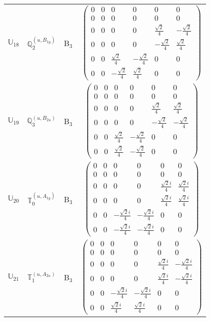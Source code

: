 \documentclass[fleqn,10pt,landscape]{article}
\begin{document}
\begin{itemize}
\begin{center}
\begin{longtable}{c|c|c|c}
$ \mathbb{U}_{18} $ & $\mathbb{Q}_{2}^{(u,B_{1g})}$ & B$_{3}$ & $\begin{pmatrix} 0 & 0 & 0 & 0 & 0 & 0 \\ 0 & 0 & 0 & 0 & 0 & 0 \\ 0 & 0 & 0 & 0 & \frac{\sqrt{2}}{4} & - \frac{\sqrt{2}}{4} \\ 0 & 0 & 0 & 0 & - \frac{\sqrt{2}}{4} & \frac{\sqrt{2}}{4} \\ 0 & 0 & \frac{\sqrt{2}}{4} & - \frac{\sqrt{2}}{4} & 0 & 0 \\ 0 & 0 & - \frac{\sqrt{2}}{4} & \frac{\sqrt{2}}{4} & 0 & 0 \end{pmatrix}$ \\
$ \mathbb{U}_{19} $ & $\mathbb{Q}_{3}^{(u,B_{2u})}$ & B$_{3}$ & $\begin{pmatrix} 0 & 0 & 0 & 0 & 0 & 0 \\ 0 & 0 & 0 & 0 & 0 & 0 \\ 0 & 0 & 0 & 0 & \frac{\sqrt{2}}{4} & \frac{\sqrt{2}}{4} \\ 0 & 0 & 0 & 0 & - \frac{\sqrt{2}}{4} & - \frac{\sqrt{2}}{4} \\ 0 & 0 & \frac{\sqrt{2}}{4} & - \frac{\sqrt{2}}{4} & 0 & 0 \\ 0 & 0 & \frac{\sqrt{2}}{4} & - \frac{\sqrt{2}}{4} & 0 & 0 \end{pmatrix}$ \\
$ \mathbb{U}_{20} $ & $\mathbb{T}_{0}^{(u,A_{1g})}$ & B$_{3}$ & $\begin{pmatrix} 0 & 0 & 0 & 0 & 0 & 0 \\ 0 & 0 & 0 & 0 & 0 & 0 \\ 0 & 0 & 0 & 0 & \frac{\sqrt{2} i}{4} & \frac{\sqrt{2} i}{4} \\ 0 & 0 & 0 & 0 & \frac{\sqrt{2} i}{4} & \frac{\sqrt{2} i}{4} \\ 0 & 0 & - \frac{\sqrt{2} i}{4} & - \frac{\sqrt{2} i}{4} & 0 & 0 \\ 0 & 0 & - \frac{\sqrt{2} i}{4} & - \frac{\sqrt{2} i}{4} & 0 & 0 \end{pmatrix}$ \\
$ \mathbb{U}_{21} $ & $\mathbb{T}_{1}^{(u,A_{2u})}$ & B$_{3}$ & $\begin{pmatrix} 0 & 0 & 0 & 0 & 0 & 0 \\ 0 & 0 & 0 & 0 & 0 & 0 \\ 0 & 0 & 0 & 0 & \frac{\sqrt{2} i}{4} & - \frac{\sqrt{2} i}{4} \\ 0 & 0 & 0 & 0 & \frac{\sqrt{2} i}{4} & - \frac{\sqrt{2} i}{4} \\ 0 & 0 & - \frac{\sqrt{2} i}{4} & - \frac{\sqrt{2} i}{4} & 0 & 0 \\ 0 & 0 & \frac{\sqrt{2} i}{4} & \frac{\sqrt{2} i}{4} & 0 & 0 \end{pmatrix}$ \\

\end{longtable}
\end{center}
\end{itemize}
\end{document}
